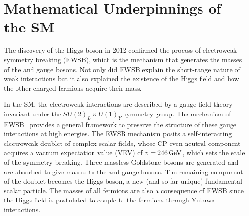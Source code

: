 \section{Mathematical Underpinnings of the SM}
\label{sec:sm_math}

The discovery of the Higgs boson in 2012 confirmed the process of electroweak symmetry breaking (EWSB), which is the mechanism that generates the masses of the \PWpm and \PZ gauge bosons.
Not only did EWSB explain the short-range nature of weak interactions but it also explained the existence of the Higgs field and how the other charged fermions acquire their mass.

In the SM, the electroweak interactions are described by a gauge field theory invariant under the $SU(2)_L \times U(1)_Y$ symmetry group.
The mechanism of EWSB~\cite{PhysRevD.2.1285, PhysRevLett.13.321, PhysRev.145.1156} provides a general framework to preserve the structure of these gauge interactions at high energies.
The EWSB mechanism posits a self-interacting electroweak doublet of complex scalar fields, whose CP-even neutral component acquires a vacuum expectation value (VEV) of $v = 246\,\text{Ge\hspace{-.08em}V}$, which sets the scale of the symmetry breaking.
Three massless Goldstone bosons are generated and are absorbed to give masses to the \PW and \PZ gauge bosons.
The remaining component of the doublet becomes the Higgs boson, a new (and so far unique) fundamental scalar particle.
The masses of all fermions are also a consequence of EWSB since the Higgs field is postulated to couple to the fermions through Yukawa interactions.


